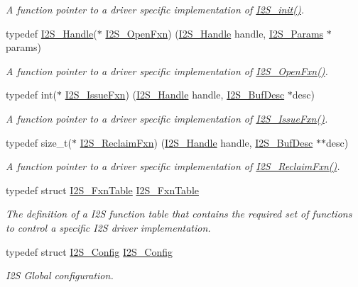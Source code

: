 \begin{DoxyCompactItemize}
\begin{DoxyCompactList}\small\item\em A function pointer to a driver specific implementation of \hyperlink{_i2_s_8h_a79e8fdf40ee80c49b2cac09a3e428a82}{I2\+S\+\_\+init()}. \end{DoxyCompactList}\item 
typedef \hyperlink{_i2_s_8h_aff0fad1efd0d9dc3c8d2cc87e73cd5a0}{I2\+S\+\_\+\+Handle}($\ast$ \hyperlink{_i2_s_8h_a0a8c4787b4a5a262dc86d9dfa7da2840}{I2\+S\+\_\+\+Open\+Fxn}) (\hyperlink{_i2_s_8h_aff0fad1efd0d9dc3c8d2cc87e73cd5a0}{I2\+S\+\_\+\+Handle} handle, \hyperlink{struct_i2_s___params}{I2\+S\+\_\+\+Params} $\ast$params)
\begin{DoxyCompactList}\small\item\em A function pointer to a driver specific implementation of \hyperlink{_i2_s_8h_a0a8c4787b4a5a262dc86d9dfa7da2840}{I2\+S\+\_\+\+Open\+Fxn()}. \end{DoxyCompactList}\item 
typedef int($\ast$ \hyperlink{_i2_s_8h_a29e133c66e4e69905690c63157ca662d}{I2\+S\+\_\+\+Issue\+Fxn}) (\hyperlink{_i2_s_8h_aff0fad1efd0d9dc3c8d2cc87e73cd5a0}{I2\+S\+\_\+\+Handle} handle, \hyperlink{struct_i2_s___buf_desc}{I2\+S\+\_\+\+Buf\+Desc} $\ast$desc)
\begin{DoxyCompactList}\small\item\em A function pointer to a driver specific implementation of \hyperlink{_i2_s_8h_a29e133c66e4e69905690c63157ca662d}{I2\+S\+\_\+\+Issue\+Fxn()}. \end{DoxyCompactList}\item 
typedef size\+\_\+t($\ast$ \hyperlink{_i2_s_8h_aeb85638443d9071ae1e46233cb7ed82c}{I2\+S\+\_\+\+Reclaim\+Fxn}) (\hyperlink{_i2_s_8h_aff0fad1efd0d9dc3c8d2cc87e73cd5a0}{I2\+S\+\_\+\+Handle} handle, \hyperlink{struct_i2_s___buf_desc}{I2\+S\+\_\+\+Buf\+Desc} $\ast$$\ast$desc)
\begin{DoxyCompactList}\small\item\em A function pointer to a driver specific implementation of \hyperlink{_i2_s_8h_aeb85638443d9071ae1e46233cb7ed82c}{I2\+S\+\_\+\+Reclaim\+Fxn()}. \end{DoxyCompactList}\item 
typedef struct \hyperlink{struct_i2_s___fxn_table}{I2\+S\+\_\+\+Fxn\+Table} \hyperlink{_i2_s_8h_aea46bf5e1dc3bfd520ba7d2911b15b8c}{I2\+S\+\_\+\+Fxn\+Table}
\begin{DoxyCompactList}\small\item\em The definition of a I2\+S function table that contains the required set of functions to control a specific I2\+S driver implementation. \end{DoxyCompactList}\item 
typedef struct \hyperlink{struct_i2_s___config}{I2\+S\+\_\+\+Config} \hyperlink{_i2_s_8h_a702f29a736651810df453469ff616606}{I2\+S\+\_\+\+Config}
\begin{DoxyCompactList}\small\item\em I2\+S Global configuration. \end{DoxyCompactList}\end{DoxyCompactItemize}
